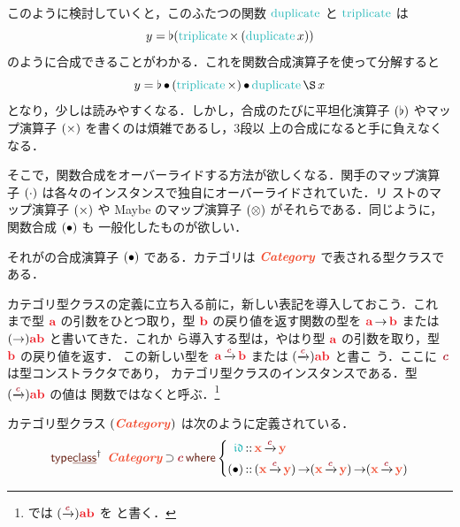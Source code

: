 \documentclass[a5paper,twoside,fleqn,draft]{jsbook}
\begin{document}
このように検討していくと，このふたつの関数 $\mDuplicate$ と
$\mTriplicate$ は
\begin{equation}
  y
  =\mJoinList(\mTriplicate\hMap{}(\mDuplicate x))
\end{equation}
のように合成できることがわかる．これを関数合成演算子を使って分解すると
\begin{equation}
  \label{eq:triplicate-duplicate}
  y
  =\mJoinList\hCompose{}(\mTriplicate\hMap)\hCompose\mDuplicate\hApply x
\end{equation}
となり，少しは読みやすくなる．しかし，合成のたびに平坦化演算子
$(\operatorname{\flat})$ やマップ演算子 $(\operatorname{\times})$ を書くのは煩雑であるし，3段以
上の合成になると手に負えなくなる．

そこで，関数合成をオーバーライドする方法が欲しくなる．関手のマップ演算
子 $(\operatorname{\cdot})$ は各々のインスタンスで独自にオーバーライドされていた．リ
ストのマップ演算子 $(\operatorname{\times})$ や Maybe のマップ演算子
$(\operatorname{\otimes})$ がそれらである．同じように，関数合成 $(\operatorname{\bullet})$ も
一般化したものが欲しい．

それがの合成演算子 $(\operatorname{\bullet})$ である．カテゴリは
$\mCatTypeClass$ で表される型クラスである．

カテゴリ型クラスの定義に立ち入る前に，新しい表記を導入しておこう．これ
まで型 $\hTypeName{a}$ の引数をひとつ取り，型 $\hTypeName{b}$ の戻り値を返す関数の型を
$\hTypeName{a}\hFunctionArrow\hTypeName{b}$ または $(\hFunctionArrow)\hTypeName{a}\hTypeName{b}$ と書いてきた．これか
ら導入する型は，やはり型 $\hTypeName{a}$ の引数を取り，型 $\hTypeName{b}$ の戻り値を返す．
この新しい型を $\hTypeName{a}\mCatArrowC\hTypeName{b}$ または $(\mCatArrowC)\hTypeName{a}\hTypeName{b}$ と書こ
う．ここに $\mTypeConstructor{c}$ は型コンストラクタであり，
カテゴリ型クラスのインスタンスである．型 $(\mCatArrowC)\hTypeName{a}\hTypeName{b}$ の値は
関数ではなくと呼ぶ．\footnote{\haskell では
  $(\mCatArrowC)\hTypeName{a}\hTypeName{b}$ を  と書く．}

カテゴリ型クラス $(\mCatTypeClass)$ は次のように定義されている．
\begin{equation}
  \mTypeClassDeclPolymorphic\;
  \mCatTypeClass\hHasElementsOf\mTypeConstructor{c}
  \mWhere\left\{
  \begin{aligned}
    \mIdCat
    &\hIsTypeOf\mX\mCatArrowC\mY\\
    (\mCompCat)
    &\hIsTypeOf{}(\mX\mCatArrowC\mY)\hFunctionArrow(\mX\mCatArrowC\mY)\hFunctionArrow(\mX\mCatArrowC\mY)
  \end{aligned}
  \right.
\end{equation}
\end{document}

